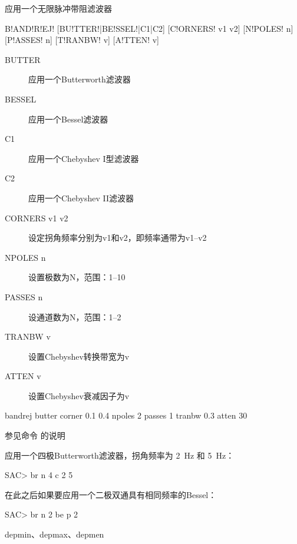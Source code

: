 \label{cmd:bandrej}

应用一个无限脉冲带阻滤波器

\begin{SACSTX}
B!AND!R!EJ! [BU!TTER!|BE!SSEL!|C1|C2] [C!ORNERS! v1 v2] [N!POLES! n] [P!ASSES! n]
    [T!RANBW! v] [A!TTEN! v]
\end{SACSTX}

\begin{description}
\item [BUTTER] 应用一个Butterworth滤波器
\item [BESSEL] 应用一个Bessel滤波器
\item [C1] 应用一个Chebyshev I型滤波器
\item [C2] 应用一个Chebyshev II滤波器
\item [CORNERS v1 v2] 设定拐角频率分别为v1和v2，即频率通带为v1--v2
\item [NPOLES n] 设置极数为N，范围：1--10
\item [PASSES n] 设通道数为N，范围：1--2
\item [TRANBW v] 设置Chebyshev转换带宽为v
\item [ATTEN v] 设置Chebyshev衰减因子为v
\end{description}

\begin{SACDFT}
bandrej butter corner 0.1 0.4 npoles 2 passes 1 tranbw 0.3 atten 30
\end{SACDFT}

参见命令  的说明

应用一个四极Butterworth滤波器，拐角频率为 \SI{2}{\Hz} 和 \SI{5}{\Hz}：
\begin{SACCode}
SAC> br n 4 c 2 5
\end{SACCode}

在此之后如果要应用一个二极双通具有相同频率的Bessel：
\begin{SACCode}
SAC> br n 2 be p 2
\end{SACCode}

depmin、depmax、depmen
